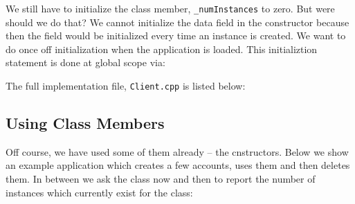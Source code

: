 We still have to initialize the class member, \verb+_numInstances+ to zero. But were 
should we do that? We cannot initialize the data field in the constructor
because then the field would be initialized every time an instance is created.
We want to do once off initialization when the application is loaded. This 
initializtion statement is done at global scope via:


The full implementation file, \verb+Client.cpp+ is listed below:

\noindent{\small }


\subsection{Using Class Members}

Off course, we have used some of them already -- the cnstructors. Below we
show an example application which creates a few accounts, uses them and then 
deletes them. In between we ask the class now and then to report the number
of instances which currently exist for the class:

\noindent{\small }

